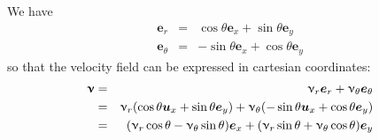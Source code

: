 We have 
\begin{eqnarray}
{\bm e}_r      &=& \cos\theta {\bm e}_x + \sin\theta {\bm e}_y \\
{\bm e}_\theta &=& -\sin\theta {\bm e}_x + \cos\theta {\bm e}_y
\end{eqnarray}
so that the velocity field can be expressed in cartesian coordinates:
\begin{eqnarray}
{\bm \upnu} 
&=& \upnu_r {\bm e}_r + \upnu_\theta {\bm e}_\theta \nonumber\\
&=& \upnu_r ( \cos\theta {\bm u}_x + \sin\theta {\bm e}_y) + \upnu_\theta (-\sin\theta {\bm u}_x + \cos\theta {\bm e}_y) \nonumber\\
&=& ( \upnu_r \cos\theta - \upnu_\theta \sin\theta  ) {\bm e}_x + ( \upnu_r \sin\theta + \upnu_\theta\cos\theta  ) {\bm e}_y
\end{eqnarray}








